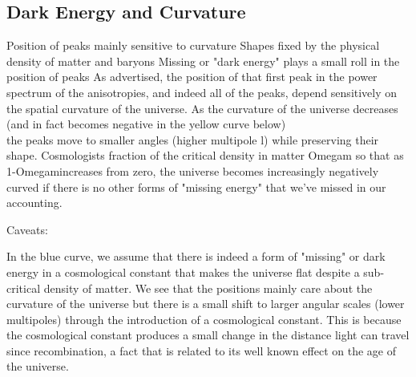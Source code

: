 \documentclass{article}
\begin{document}
\subsection{Dark Energy and Curvature}

Position of peaks mainly sensitive to curvature
Shapes fixed by the physical density of matter and baryons
Missing or "dark energy" plays a small roll in the position of peaks
As advertised, the position of that first peak in the power spectrum of the anisotropies, and indeed all of the peaks, depend sensitively on the spatial curvature of the universe.   As the curvature of the universe decreases (and in fact becomes negative in the yellow curve below)\\
the peaks move to smaller angles (higher multipole l) while preserving their shape.  Cosmologists fraction of the critical density in matter Omegam so that as 1-Omegamincreases from zero, the universe becomes increasingly negatively curved if there is no other forms of "missing energy" that we've missed in our accounting.

Caveats:

In the blue curve, we assume that there is indeed a form of "missing" or dark energy in a cosmological constant that makes the universe flat despite a sub-critical density of matter.  We see that the positions mainly care about the curvature of the universe but there is a small shift to larger angular scales (lower multipoles) through the introduction of a cosmological constant.  This is because the cosmological constant produces a small change in the distance light can travel since recombination, a fact that is related to its well known effect on the age of the universe. 
\end{document}

